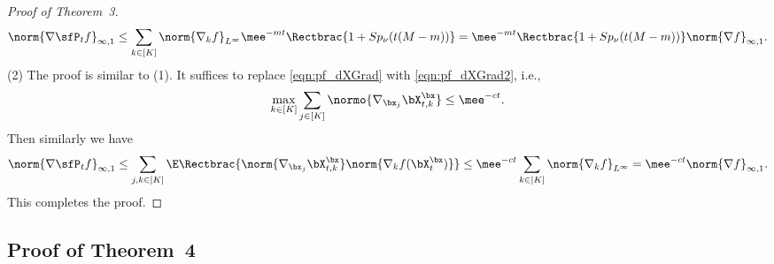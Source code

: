 \documentclass[11pt]{article}
\begin{document}
\begin{proof}[Proof of Theorem~3]
\begin{equation}
    \norm{\nabla \sfP_t f}_{\infty,1} \le \sum_{k\in[K]} \norm{ \nabla_k f }_{L^\infty} \mee^{-mt} \Rectbrac{ 1+ S p_\nu ( t(M-m) ) } = \mee^{-mt} \Rectbrac{ 1+ S p_\nu ( t(M-m) ) } \norm{\nabla f}_{\infty,1}.
\end{equation}
(2) The proof is similar to (1). It suffices to replace \eqref{eqn:pf_dXGrad} with \eqref{eqn:pf_dXGrad2}, i.e.,
\begin{equation}
    \max_{k\in[K]} \sum_{j \in [K]} \normo{ \nabla_{\bx_j} \bX_{t,k}^\bx } \le \mee^{-c t}. 
\end{equation}
Then similarly we have
\begin{equation}
    \norm{ \nabla \sfP_t f}_{\infty,1} \le \sum_{j,k\in[K]} \E \Rectbrac{ \norm{ \nabla_{\bx_j} \bX_{t,k}^\bx } \norm{ \nabla_k f(\bX_t^\bx) } } \le \mee^{-ct} \sum_{k\in[K]} \norm{ \nabla_k f }_{L^\infty} = \mee^{-ct} \norm{\nabla f}_{\infty,1}.
\end{equation}
This completes the proof. 
\end{proof}

\subsection{Proof of Theorem~4}
\label{app:thm_margin}
\end{document}
